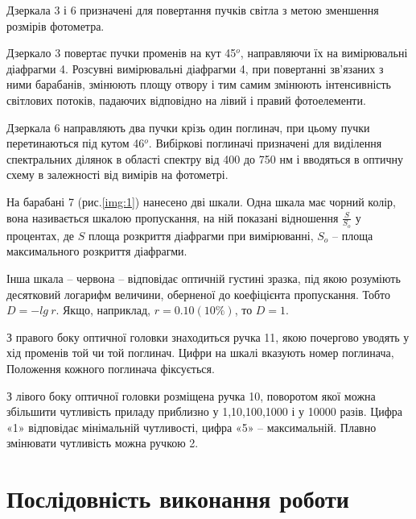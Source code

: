 \documentclass[onecolumn]{el-author}
\begin{document}
Дзеркала 3 і 6 призначені для повертання пучків світла з метою
зменшення розмірів фотометра.

Дзеркало 3 повертає пучки променів на кут 45$^{o}$, направляючи їх на
вимірювальні діафрагми 4. Розсувні вимірювальні діафрагми 4, при
повертанні зв'язаних з ними барабанів, змінюють площу отвору і тим самим
змінюють інтенсивність світлових потоків, падаючих відповідно на лівий і
правий фотоелементи.

Дзеркала 6 направляють два пучки крізь один поглинач, при цьому
пучки перетинаються під кутом 46$^{o}$. Вибіркові поглиначі призначені для
виділення спектральних ділянок в області спектру від 400 до 750 нм і
вводяться в оптичну схему в залежності від вимірів на фотометрі.

На барабані 7 (рис.\ref{img:1}) нанесено дві шкали. Одна шкала має чорний
колір, вона називається шкалою пропускання, на ній показані відношення
$\frac{S}{S_{o}}$ 
у процентах, де $S$ площа розкриття діафрагми при вимірюванні, $S_{o}$ --
площа максимального розкриття діафрагми.

Інша шкала -- червона -- відповідає оптичній густині зразка, під якою
розуміють десятковий логарифм величини, оберненої до коефіцієнта
пропускання. Тобто $D = -lg~r$. Якщо, наприклад, $r = 0.10(10\%)$, то $D=1$.

З правого боку оптичної головки знаходиться ручка 11, якою почергово
уводять у хід променів той чи той поглинач. Цифри на шкалі вказують номер
поглинача, Положення кожного поглинача фіксується.

З лівого боку оптичної головки розміщена ручка 10, поворотом якої
можна збільшити чутливість приладу приблизно у 1,10,100,1000 і у 10000
разів. Цифра «1» відповідає мінімальній чутливості, цифра «5» --
максимальній. Плавно змінювати чутливість можна ручкою 2.

\section{Послідовність виконання роботи}
\end{document}
